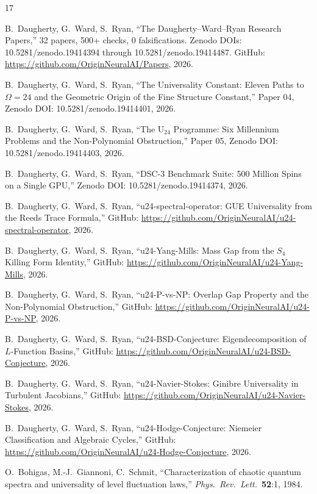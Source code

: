 \documentclass[11pt,a4paper]{article}
\begin{document}
\begin{thebibliography}{17}

B.~Daugherty, G.~Ward, S.~Ryan,
``The Daugherty--Ward--Ryan Research Papers,'' 32 papers, 500+ checks, 0 falsifications.
Zenodo DOIs: 10.5281/zenodo.19414394 through 10.5281/zenodo.19414487.
GitHub: \url{https://github.com/OriginNeuralAI/Papers}, 2026.

B.~Daugherty, G.~Ward, S.~Ryan,
``The Universality Constant: Eleven Paths to $\Omega = 24$ and the Geometric Origin of the Fine Structure Constant,''
Paper 04, Zenodo DOI: 10.5281/zenodo.19414401, 2026.

B.~Daugherty, G.~Ward, S.~Ryan,
``The U$_{24}$ Programme: Six Millennium Problems and the Non-Polynomial Obstruction,''
Paper 05, Zenodo DOI: 10.5281/zenodo.19414403, 2026.

B.~Daugherty, G.~Ward, S.~Ryan,
``DSC-3 Benchmark Suite: 500 Million Spins on a Single GPU,''
Zenodo DOI: 10.5281/zenodo.19414374, 2026.

B.~Daugherty, G.~Ward, S.~Ryan,
``u24-spectral-operator: GUE Universality from the Reeds Trace Formula,''
GitHub: \url{https://github.com/OriginNeuralAI/u24-spectral-operator}, 2026.

B.~Daugherty, G.~Ward, S.~Ryan,
``u24-Yang-Mills: Mass Gap from the $S_4$ Killing Form Identity,''
GitHub: \url{https://github.com/OriginNeuralAI/u24-Yang-Mills}, 2026.

B.~Daugherty, G.~Ward, S.~Ryan,
``u24-P-vs-NP: Overlap Gap Property and the Non-Polynomial Obstruction,''
GitHub: \url{https://github.com/OriginNeuralAI/u24-P-vs-NP}, 2026.

B.~Daugherty, G.~Ward, S.~Ryan,
``u24-BSD-Conjecture: Eigendecomposition of $L$-Function Basins,''
GitHub: \url{https://github.com/OriginNeuralAI/u24-BSD-Conjecture}, 2026.

B.~Daugherty, G.~Ward, S.~Ryan,
``u24-Navier-Stokes: Ginibre Universality in Turbulent Jacobians,''
GitHub: \url{https://github.com/OriginNeuralAI/u24-Navier-Stokes}, 2026.

B.~Daugherty, G.~Ward, S.~Ryan,
``u24-Hodge-Conjecture: Niemeier Classification and Algebraic Cycles,''
GitHub: \url{https://github.com/OriginNeuralAI/u24-Hodge-Conjecture}, 2026.

O.~Bohigas, M.-J.~Giannoni, C.~Schmit,
``Characterization of chaotic quantum spectra and universality of level fluctuation laws,''
\emph{Phys.\ Rev.\ Lett.}\ \textbf{52}:1, 1984.


\end{thebibliography}
\end{document}
